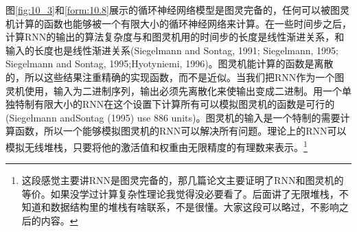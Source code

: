 图\ref{fig:10_3}和\ref{form:10.8}展示的循环神经网络模型是图灵完备的，任何可以被图灵机计算的函数也能够被一个有限大小的循环神经网络来计算。在一些时间步之后，计算RNN的输出的算法复杂度与和图灵机用的时间步的长度是线性渐进关系，和输入的长度也是线性渐进关系(Siegelmann and Sontag, 1991; Siegelmann, 1995; Siegelmann and Sontag, 1995;Hyotyniemi, 1996)。图灵机能计算的函数是离散的，所以这些结果注重精确的实现函数，而不是近似。当我们把RNN作为一个图灵机使用，输入为二进制序列，输出必须先离散化来使输出变成二进制。用一个单独特制有限大小的RNN在这个设置下计算所有可以模拟图灵机的函数是可行的(Siegelmann andSontag (1995) use 886 units)。图灵机的输入是一个特制的需要计算函数，所以一个能够模拟图灵机的RNN可以解决所有问题。理论上的RNN可以模拟无线堆栈，只要将他的激活值和权重由无限精度的有理数来表示。\footnote{这段感觉主要讲RNN是图灵完备的，那几篇论文主要证明了RNN和图灵机的等价。如果没学过计算复杂性理论我觉得没必要看了。后面讲了无限堆栈，不知道和数据结构里的堆栈有啥联系，不是很懂。大家这段可以略过，不影响之后的内容。}

